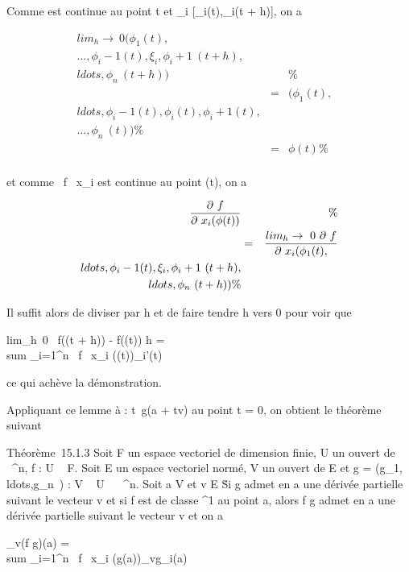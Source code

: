 \documentclass[]{article}
\begin{document}
Comme \phi est continue au point t et \xi_i \in
{[}\phi_i(t),\phi_i(t + h){]}, on a

\begin{align*}
lim_h\rightarrow~0(\phi_1(t),\\\ldots,\phi_i-1(t),\xi_i,\phi_i+1~(t
+
h),\\ldots,\phi_n~(t
+ h))&&\%& \\ & =&
(\phi_1(t),\\ldots,\phi_i-1(t),\phi_i(t),\phi_i+1(t),\\\ldots,\phi_n~(t))\%&
\\ & =& \phi(t) \%&
\\ \end{align*}

et comme  \partial~f \over \partial~x_i est continue au
point \phi(t), on a

\begin{align*} \partial~f \over
\partial~x_i (\phi(t))&& \%& \\ & =&
lim_h\rightarrow~0~ \partial~f \over
\partial~x_i
(\phi_1(t),\\ldots,\phi_i-1(t),\xi_i,\phi_i+1~(t
+
h),\\ldots,\phi_n~(t
+ h))\%& \\
\end{align*}

Il suffit alors de diviser par h et de faire tendre h vers 0 pour voir
que

lim_h\rightarrow~0~ f(\phi(t + h)) - f(\phi(t))
\over h = \\sum
_i=1^n \partial~f \over \partial~x_i
(\phi(t))\phi_i'(t)

ce qui achève la démonstration.

Appliquant ce lemme à \phi : t\mapsto~g(a + tv) au
point t = 0, on obtient le théorème suivant

Théorème~15.1.3 Soit F un espace vectoriel de dimension finie, U un
ouvert de ~^n, f : U \rightarrow~ F. Soit E un espace vectoriel normé, V
un ouvert de E et g =
(g_1,\\ldots,g_n~)
: V \rightarrow~ U \subset~ ~^n. Soit a \in V et v \in E
\diagdown\0\. Si g admet en a une dérivée
partielle suivant le vecteur v et si f est de classe ^1 au
point a, alors f \cdot g admet en a une dérivée partielle suivant le vecteur
v et on a

\partial_v(f \cdot g)(a) = \\sum
_i=1^n \partial~f \over \partial~x_i
(g(a))\partial_vg_i(a)
\end{document}
